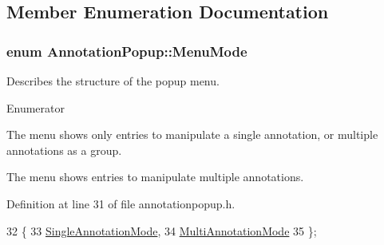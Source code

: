 \subsection{Member Enumeration Documentation}
\hypertarget{classAnnotationPopup_af8654f3f9c2a3377f86daf329f1e0679}{
\subsubsection[{Menu\+Mode}]{\setlength{\rightskip}{0pt plus 5cm}enum {\bf Annotation\+Popup\+::\+Menu\+Mode}}}\label{classAnnotationPopup_af8654f3f9c2a3377f86daf329f1e0679}
Describes the structure of the popup menu. \begin{Desc}
\item[Enumerator]\par
\begin{description}
\item[{\em 
\hypertarget{classAnnotationPopup_af8654f3f9c2a3377f86daf329f1e0679a40137692e843ce4f994737bd4a6f68f1}{Single\+Annotation\+Mode}\label{classAnnotationPopup_af8654f3f9c2a3377f86daf329f1e0679a40137692e843ce4f994737bd4a6f68f1}
}]The menu shows only entries to manipulate a single annotation, or multiple annotations as a group. \item[{\em 
\hypertarget{classAnnotationPopup_af8654f3f9c2a3377f86daf329f1e0679addf6a6dddf8c14065bb700f1835dafb9}{Multi\+Annotation\+Mode}\label{classAnnotationPopup_af8654f3f9c2a3377f86daf329f1e0679addf6a6dddf8c14065bb700f1835dafb9}
}]The menu shows entries to manipulate multiple annotations. \end{description}
\end{Desc}


Definition at line 31 of file annotationpopup.\+h.


\begin{DoxyCode}
32         \{
33             \hyperlink{classAnnotationPopup_af8654f3f9c2a3377f86daf329f1e0679a40137692e843ce4f994737bd4a6f68f1}{SingleAnnotationMode}, 
34             \hyperlink{classAnnotationPopup_af8654f3f9c2a3377f86daf329f1e0679addf6a6dddf8c14065bb700f1835dafb9}{MultiAnnotationMode}   
35         \};
\end{DoxyCode}


